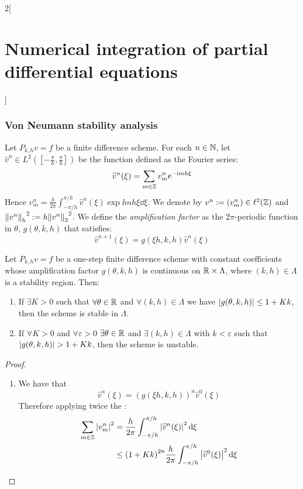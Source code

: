 \documentclass[../../../main_math.tex]{subfiles}
\begin{document}
\begin{multicols}{2}[\section{Numerical integration of partial differential equations}]
  \subsubsection{Von Neumann stability analysis}
  \begin{definition}
    Let $P_{k,h}{v}={f}$ be a finite difference scheme. For each $n\in\mathbb{N}$, let ${\widehat{v}}^n\in L^2\left(\left[-\frac{\pi}{h},\frac{\pi}{h}\right]\right)$ be the function defined as the Fourier series: $${\widehat{v}}^n(\xi)=\sum_{m\in\mathbb{Z}}{v}_{m}^n\mathrm{e}^{-\mathrm{i} m h \xi}$$ Hence $\displaystyle {v}_m^n=\frac{h}{2\pi}\int_{-\pi/h}^{\pi/h} {\widehat{v}}^n(\xi)\exp{\ii mh \xi}\dd{\xi}$. We denote by ${v}^n:=({v}_m^n)\in\ell^2(\mathbb{Z})$ and ${\left\|v^n\right\|_h}^2:=h{\left\|v^n\right\|_{2}}^2$. We define the \emph{amplification factor} as the $2\pi$-periodic function in $\theta$, $g(\theta, k, h)$ that satisfies:
    $${\widehat{v}}^{n+1}(\xi)=g(\xi h,k,h){\widehat{v}}^n(\xi)$$
  \end{definition}
  \begin{theorem}
    Let $P_{k,h}{v}={f}$ be a one-step finite difference scheme with constant coefficients whose amplification factor $g(\theta,k,h)$ is continuous on $\mathbb{R}\times\Lambda$, where $(k,h)\in\Lambda$ is a stability region. Then:
    \begin{enumerate}
      \item If $\exists K>0$ such that $\forall\theta\in\mathbb{R}$ and $\forall(k,h)\in\Lambda$ we have $\abs{g(\theta,k,h)}\leq 1+Kk$, then the scheme is stable in $\Lambda$.
      \item If $\forall K>0$ and $\forall\varepsilon>0$ $\exists\theta\in\mathbb{R}$ and $\exists(k,h)\in\Lambda$ with $k<\varepsilon$ such that $\abs{g(\theta, k,h)}>1+Kk$, then the scheme is unstable.
    \end{enumerate}
  \end{theorem}
  \begin{proof}
    \begin{enumerate}
      \item We have that $${\widehat{v}}^{n}(\xi)={(g(\xi h,k,h))}^n{\widehat{v}}^0(\xi)$$ Therefore applying twice the :
            \begin{align*}
              \sum_{m\in\ZZ}\abs{{v}_m^n}^2 & =\frac{h}{2\pi}\int_{-\pi/h}^{\pi/h} \abs{\widehat{v}^n(\xi)}^2\dd{\xi}                 \\
                                            & \leq{(1+Kk)}^{2n}\frac{h}{2\pi}\int_{-\pi/h}^{\pi/h} \abs{\widehat{v}^0(\xi)}^2\dd{\xi} \\

\end{align*}
\end{enumerate}
\end{proof}
\end{multicols}
\end{document}
